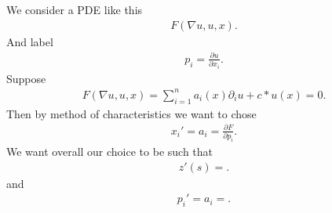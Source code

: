 \begin{example}
  We consider a PDE like this 
  \begin{align*}
    F(\nabla u , u , x)
  .\end{align*}
  And label 
  \begin{align*}
    p_i = \frac{\partial u}{\partial x_i} 
  .\end{align*}
  Suppose 
  \begin{align*}
    F(\nabla u , u ,x) = \sum_{i=1}^{n} a_{i}(x) \partial_i u + c*u(x) = 0
  .\end{align*}
  Then by method of characteristics we want to chose 
  \begin{align*}
    x_i' = a_i = \frac{\partial F}{\partial p_i} 
  .\end{align*}
  We want overall our choice to be such that 
  \begin{align*}
    z'(s) = 
  .\end{align*}
  and 
  \begin{align*}
    p_i' = a_i = 
  .\end{align*}
\end{example}

